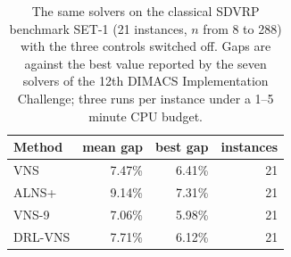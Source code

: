\begin{table}[tb]
\centering
\caption{The same solvers on the classical SDVRP benchmark SET-1 (21 instances, $n$ from 8 to 288) with the three controls switched off. Gaps are against the best value reported by the seven solvers of the 12th DIMACS Implementation Challenge; three runs per instance under a 1--5 minute CPU budget.}
\label{tab:sdvrp}
\small
\begin{tabular}{@{}lrrr@{}}
\toprule
Method & mean gap & best gap & instances \\
\midrule
VNS & 7.47\% & 6.41\% & 21 \\
ALNS+ & 9.14\% & 7.31\% & 21 \\
VNS-9 & 7.06\% & 5.98\% & 21 \\
DRL-VNS & 7.71\% & 6.12\% & 21 \\
\bottomrule
\end{tabular}
\end{table}
